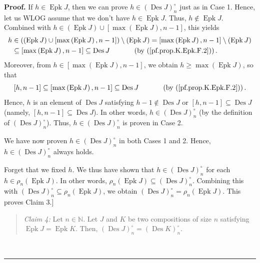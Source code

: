 \documentclass[numbers=enddot,12pt,final,onecolumn,notitlepage]{scrartcl}%
\theoremstyle{definition}
\newenvironment{statement}{\begin{quote}}{\end{quote}}
\newenvironment{proof}[1][Proof]{\noindent\textbf{#1.} }{\ \rule{0.5em}{0.5em}}
\newenvironment{verlong}{}{}
\begin{document}
\begin{verlong}
\begin{proof}
If $h\in\operatorname{Epk}J$, then we can prove $h\in\left(
\operatorname{Des}J\right)  _{n}^{\circ}$ just as in Case 1. Hence, let us
WLOG assume that we don't have $h\in\operatorname{Epk}J$. Thus,
$h\notin\operatorname{Epk}J$. Combined with $h\in\left(  \operatorname{Epk}
J\right)  \cup\left[  \max\left(  \operatorname{Epk}J\right)  ,n-1\right]  $,
this yields%
\begin{align*}
h  &  \in\left(  \left(  \operatorname{Epk}J\right)  \cup\left[  \max\left(
\operatorname{Epk}J\right)  ,n-1\right]  \right)  \setminus\left(
\operatorname{Epk}J\right)  =\left[  \max\left(  \operatorname{Epk}J\right)
,n-1\right]  \setminus\left(  \operatorname{Epk}J\right) \\
&  \subseteq\left[  \max\left(  \operatorname{Epk}J\right)  ,n-1\right]
\subseteq\operatorname{Des}J\ \ \ \ \ \ \ \ \ \ \left(  \text{by
(\ref{pf.prop.K.Epk.F.2})}\right)  .
\end{align*}
Moreover, from $h\in\left[  \max\left(  \operatorname{Epk}J\right)
,n-1\right]  $, we obtain $h\geq\max\left(  \operatorname{Epk}J\right)  $, so
that%
\[
\left[  h,n-1\right]  \subseteq\left[  \max\left(  \operatorname{Epk}%
J\right)  ,n-1\right]  \subseteq\operatorname{Des}%
J\ \ \ \ \ \ \ \ \ \ \left(  \text{by (\ref{pf.prop.K.Epk.F.2})}\right)  .
\]
Hence, $h$ is an element of $\operatorname{Des}J$ satisfying $h-1\notin%
\operatorname{Des}J$ or $\left[  h,n-1\right]  \subseteq\operatorname{Des}J$
(namely, $\left[  h,n-1\right]  \subseteq\operatorname{Des}J$). In other
words, $h\in\left(  \operatorname{Des}J\right)  _{n}^{\circ}$ (by the
definition of $\left(  \operatorname{Des}J\right)  _{n}^{\circ}$). Thus,
$h\in\left(  \operatorname{Des}J\right)  _{n}^{\circ}$ is proven in Case 2.

We have now proven $h\in\left(  \operatorname{Des}J\right)  _{n}^{\circ}$ in
both Cases 1 and 2. Hence, $h\in\left(  \operatorname{Des}J\right)
_{n}^{\circ}$ always holds.

Forget that we fixed $h$. We thus have shown that $h\in\left(
\operatorname{Des}J\right)  _{n}^{\circ}$ for each $h\in\rho_{n}\left(
\operatorname{Epk}J\right)  $. In other words, $\rho_{n}\left(
\operatorname{Epk}J\right)  \subseteq\left(  \operatorname{Des}J\right)
_{n}^{\circ}$. Combining this with $\left(  \operatorname{Des}J\right)
_{n}^{\circ}\subseteq\rho_{n}\left(  \operatorname{Epk}J\right)  $, we obtain
$\left(  \operatorname{Des}J\right)  _{n}^{\circ}=\rho_{n}\left(
\operatorname{Epk}J\right)  $. This proves Claim 3.]

\begin{statement}
\textit{Claim 4:} Let $n\in\mathbb{N}$. Let $J$ and $K$ be two compositions of
size $n$ satisfying $\operatorname{Epk}J=\operatorname{Epk}K$. Then,
$\left(  \operatorname{Des}J\right)  _{n}^{\circ}=\left(  \operatorname{Des}%
K\right)  _{n}^{\circ}$.
\end{statement}


\end{proof}
\end{verlong}
\end{document}
